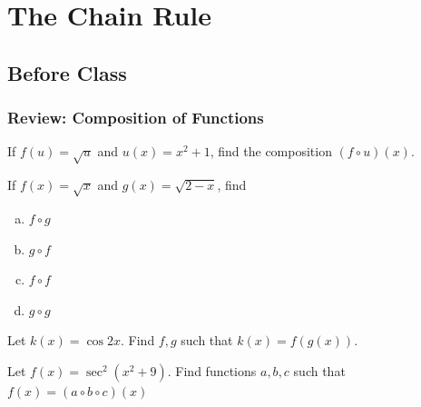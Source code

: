 \documentclass[notes]{subfiles}
\begin{document}
	\fancyhead[LO,RE]{\bfseries \currentname}
	\fancyfoot[C]{{}}
	\fancyfoot[RO,LE]{\large \thepage}	%
		
\section*{The Chain Rule}\label{cs25}
	\subsection*{Before Class}
	\subsubsection*{Review: Composition of Functions}
		\begin{ex}
			If $f(u)= \sqrt{u}$ and $u(x) = x^2 + 1$, find the composition $(f\circ u)(x)$.
		\end{ex}

		\begin{ex}
			If $f(x) = \sqrt{x}$ and $g(x) = \sqrt{2-x}$, find 
				\begin{enumerate}[(a)]
					\item $f\circ g$
						
					\item $g\circ f$
						
					\item $f\circ f$
						
					\item $g\circ g$
				\end{enumerate}
		\end{ex}
			\newpage
			
		\begin{ex}
			Let $k(x) = \cos 2x$.  Find $f,g$ such that $k(x) = f(g(x))$.
		\end{ex}
			\vs{1}
			
		\begin{ex}
			Let $f(x) = \sec^2 (x^2 + 9)$.  Find functions $a,b,c$ such that $f(x) = (a\circ b\circ c)(x)$
		\end{ex}
			
\end{document}
